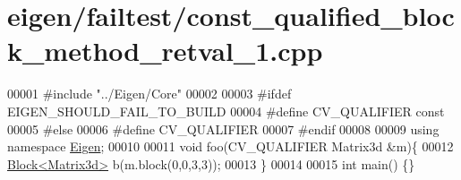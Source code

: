 \hypertarget{eigen_2failtest_2const__qualified__block__method__retval__1_8cpp_source}{}\section{eigen/failtest/const\+\_\+qualified\+\_\+block\+\_\+method\+\_\+retval\+\_\+1.cpp}
\label{eigen_2failtest_2const__qualified__block__method__retval__1_8cpp_source}

\begin{DoxyCode}
00001 \textcolor{preprocessor}{#include "../Eigen/Core"}
00002 
00003 \textcolor{preprocessor}{#ifdef EIGEN\_SHOULD\_FAIL\_TO\_BUILD}
00004 \textcolor{preprocessor}{#define CV\_QUALIFIER const}
00005 \textcolor{preprocessor}{#else}
00006 \textcolor{preprocessor}{#define CV\_QUALIFIER}
00007 \textcolor{preprocessor}{#endif}
00008 
00009 \textcolor{keyword}{using namespace }\hyperlink{namespace_eigen}{Eigen};
00010 
00011 \textcolor{keywordtype}{void} foo(CV\_QUALIFIER Matrix3d &m)\{
00012     \hyperlink{group___core___module_class_eigen_1_1_block}{Block<Matrix3d>} b(m.block(0,0,3,3));
00013 \}
00014 
00015 \textcolor{keywordtype}{int} main() \{\}
\end{DoxyCode}
